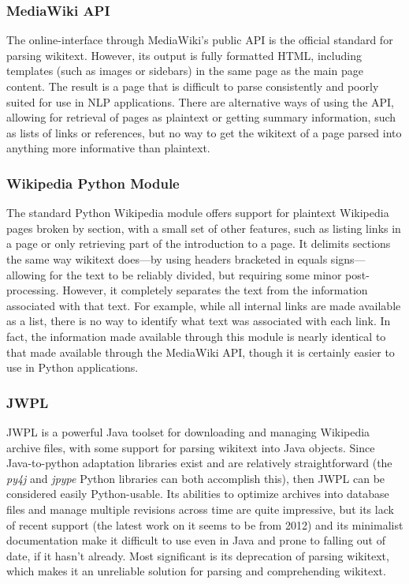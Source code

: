 \subsubsection*{MediaWiki API}

The online-interface through MediaWiki's public API\cite{mediawikiapi} is the official standard for parsing wikitext. However, its output is fully formatted HTML, including templates (such as images or sidebars) in the same page as the main page content. The result is a page that is difficult to parse consistently and poorly suited for use in NLP applications. There are alternative ways of using the API, allowing for retrieval of pages as plaintext or getting summary information, such as lists of links or references, but no way to get the wikitext of a page parsed into anything more informative than plaintext.

\subsubsection*{Wikipedia Python Module}

The standard Python Wikipedia module\cite{pywikimodule} offers support for plaintext Wikipedia pages broken by section, with a small set of other features, such as listing links in a page or only retrieving part of the introduction to a page. It delimits sections the same way wikitext does---by using headers bracketed in equals signs---allowing for the text to be reliably divided, but requiring some minor post-processing. However, it completely separates the text from the information associated with that text. For example, while all internal links are made available as a list, there is no way to identify what text was associated with each link. In fact, the information made available through this module is nearly identical to that made available through the MediaWiki API, though it is certainly easier to use in Python applications.

\subsubsection*{JWPL}

JWPL\cite{jwpl} is a powerful Java toolset for downloading and managing Wikipedia archive files, with some support for parsing wikitext into Java objects. Since Java-to-python adaptation libraries exist and are relatively straightforward (the \emph{py4j} and \emph{jpype} Python libraries can both accomplish this), then JWPL can be considered easily Python-usable. Its abilities to optimize archives into database files and manage multiple revisions across time are quite impressive, but its lack of recent support (the latest work on it seems to be from 2012) and its minimalist documentation make it difficult to use even in Java and prone to falling out of date, if it hasn't already. Most significant is its deprecation of parsing wikitext, which makes it an unreliable solution for parsing and comprehending wikitext.

